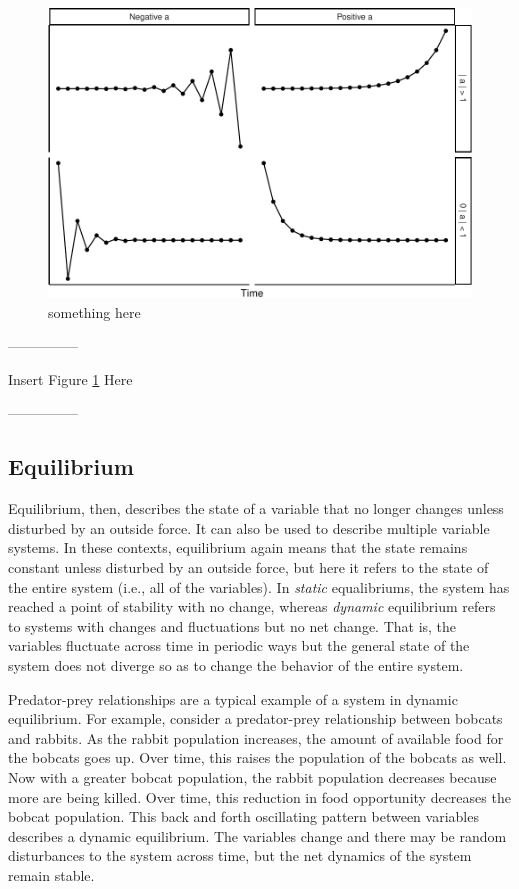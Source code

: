 \documentclass[english,,man]{apa6}
\theoremstyle{definition}
\theoremstyle{definition}
\theoremstyle{definition}
\theoremstyle{remark}
\begin{document}
\begin{figure}
\centering
\includegraphics{figs/unnamed-chunk-6-1.pdf}
\caption{\label{fig:unnamed-chunk-6}something here\label{dynamics_plot}}
\end{figure}

\begin{center}

---------------

Insert Figure \ref{dynamics_plot} Here

---------------

\end{center}

\hypertarget{equilibrium}{%
\subsection{Equilibrium}\label{equilibrium}}

Equilibrium, then, describes the state of a variable that no longer
changes unless disturbed by an outside force. It can also be used to
describe multiple variable systems. In these contexts, equilibrium again
means that the state remains constant unless disturbed by an outside
force, but here it refers to the state of the entire system (i.e., all
of the variables). In \emph{static} equalibriums, the system has reached
a point of stability with no change, whereas \emph{dynamic} equilibrium
refers to systems with changes and fluctuations but no net change. That
is, the variables fluctuate across time in periodic ways but the general
state of the system does not diverge so as to change the behavior of the
entire system.

Predator-prey relationships are a typical example of a system in dynamic
equilibrium. For example, consider a predator-prey relationship between
bobcats and rabbits. As the rabbit population increases, the amount of
available food for the bobcats goes up. Over time, this raises the
population of the bobcats as well. Now with a greater bobcat population,
the rabbit population decreases because more are being killed. Over
time, this reduction in food opportunity decreases the bobcat
population. This back and forth oscillating pattern between variables
describes a dynamic equilibrium. The variables change and there may be
random disturbances to the system across time, but the net dynamics of
the system remain stable.
\end{document}

